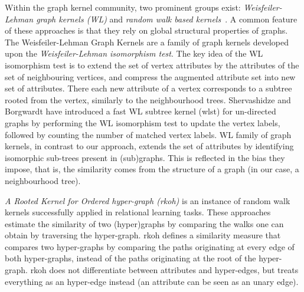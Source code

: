Within the graph kernel community, two prominent groups exist:  \textit{Weisfeiler-Lehman graph kernels (WL)} \cite{Shervashidze2011,shervashidze09fastsubtree,FrasconiCRG14,haussler99convolution,ICPR2014BaiRH}  and \textit{random walk based kernels}~\cite{WachmanK07,Lovasz1996}.
A common feature of these approaches is that they rely on global structural properties of graphs.
The Weisfeiler-Lehman Graph Kernels are a family of graph kernels developed upon the \textit{Weisfeiler-Lehman isomorphism test}.
The key idea of the WL isomorphism test is to extend the set of vertex attributes by the attributes of the set of neighbouring vertices, and compress the augmented attribute set into new set of attributes.
There each new attribute of a vertex corresponds to a subtree rooted from the vertex, similarly to the neighbourhood trees.
Shervashidze and Borgwardt have introduced a fast WL subtree kernel (\gls{wlst}) \cite{shervashidze09fastsubtree} for un-directed graphs by performing the WL isomorphism test to update the vertex labels, followed by counting the number of matched vertex labels.
WL family of graph kernels, in contrast to our approach, extends the set of attributes by identifying isomorphic sub-trees present in (sub)graphs.
This is reflected in the bias they impose, that is, the similarity comes from the structure of a graph (in our case, a neighbourhood tree).


\textit{A Rooted Kernel for Ordered hyper-graph (\gls{rkoh})} \cite{WachmanK07} is an instance of random walk kernels successfully applied in relational learning tasks.
These approaches estimate the similarity of two (hyper)graphs by comparing the walks one can obtain by traversing the hyper-graph.
\gls{rkoh} defines a similarity measure that compares two hyper-graphs by comparing the paths originating at every edge of both hyper-graphs, instead of the paths originating at the root of the hyper-graph.
\gls{rkoh} does not differentiate between attributes and hyper-edges, but treats everything as an hyper-edge instead (an attribute can be seen as an unary edge).


